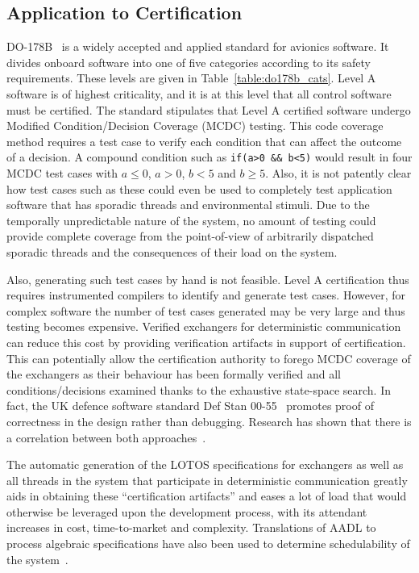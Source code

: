 \subsection{Application to Certification}
DO-178B~\cite{do178b} is a widely accepted and applied standard for
avionics software. It divides onboard software into one of five
categories according to its safety requirements. These levels are
given in Table~\ref{table:do178b_cats}. Level A software is of highest
criticality, and it is at this level that all control software must be
certified. The standard stipulates that Level A certified software
undergo Modified Condition/Decision Coverage (MCDC) testing. This code
coverage method requires a test case to verify each condition that can
affect the outcome of a decision. A compound condition such as
\texttt{if(a>0 \&\& b<5)} would result in four MCDC test cases with
$a\le 0$, $a>0$, $b<5$ and $b\ge 5$. Also, it is not patently clear
how test cases such as these could even be used to completely test
application software that has sporadic threads and environmental
stimuli. Due to the temporally unpredictable nature of the system, no
amount of testing could provide complete coverage from the
point-of-view of arbitrarily dispatched sporadic threads and the
consequences of their load on the system.

Also, generating such test cases by hand is not feasible. Level A
certification thus requires instrumented compilers to identify and
generate test cases. However, for complex software the number of test
cases generated may be very large and thus testing becomes
expensive. Verified exchangers for deterministic communication can
reduce this cost by providing verification artifacts in support of
certification. This can potentially allow the certification authority
to forego MCDC coverage of the exchangers as their behaviour has been
formally verified and all conditions/decisions examined thanks to the
exhaustive state-space search. In fact, the UK defence software
standard Def Stan 00-55~\cite{uk-def-stan} promotes proof of
correctness in the design rather than debugging. Research has shown
that there is a correlation between both
approaches~\cite{gasperoni@ae02}.

The automatic generation of the LOTOS specifications for exchangers as
well as all threads in the system that participate in deterministic
communication greatly aids in obtaining these ``certification
artifacts'' and eases a lot of load that would otherwise be leveraged
upon the development process, with its attendant increases in cost,
time-to-market and complexity. Translations of AADL to process
algebraic specifications have also been used to determine
schedulability of the system~\cite{sokolsky@ipdps06}.


